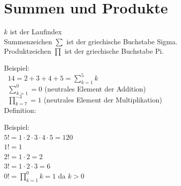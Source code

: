 \section{Summen und Produkte}


\begin{center}
\end{center}
$k$ ist der Laufindex\\
Summenzeichen $\sum$ ist der griechische Buchstabe Sigma.\\
Produktzeichen $\prod$ ist der griechische Buchstabe Pi.

\begin{center}
\end{center}
Beispiel:\\
\textbullet$\;\;14=2+3+4+5=\sum\limits_{k=1}^{5}k$\\
\textbullet$\;\;\sum\limits_{k=1}^{0}=0$ (neutrales Element der Addition)\\
\textbullet$\;\;\prod\limits_{k=7}^{-3}=1$ (neutrales Element der Multiplikation)\vspace*{4mm}\\


Definition:\vspace*{2mm}\\
\begin{center}
\end{center}
Beispiel:\\
$5!=1\cdot 2\cdot 3 \cdot 4 \cdot 5=120$\\
$1!=1$\\
$2!=1\cdot2=2$\\
$3!=1 \cdot 2 \cdot 3=6$\\
$0!=\prod\limits_{k=1}^{0}k=1$ da $k>0$\\
